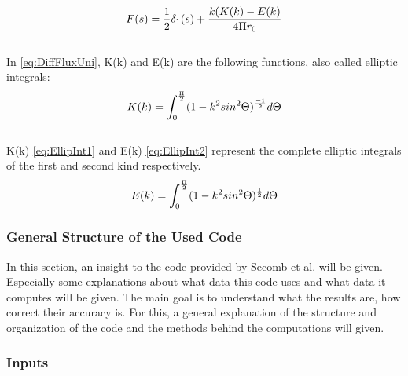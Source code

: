 %
\begin{equation}
\\F(s) = \frac{1}{2} \delta_1 (s) + \frac{k (K(k) - E(k)}{4 \Pi r_0}
\label{eq:DiffFluxUni}
\end{equation}
\\In \ref{eq:DiffFluxUni}, K(k) and E(k) are the following functions, also called elliptic integrals:
%
\begin{equation}
\\K(k) = \int_{0}^{\frac{\Pi}{2}} (1 - k^2 sin^2 \Theta)^ \frac{-1}{2} d \Theta
\label{eq:EllipInt1}
\end{equation}
\\K(k) \ref{eq:EllipInt1} and E(k) \ref{eq:EllipInt2} represent the complete elliptic integrals of the first and second kind respectively.
%
\begin{equation}
\\E(k) = \int_{0}^{\frac{\Pi}{2}} (1 - k^2 sin^2 \Theta)^ \frac{1}{2} d \Theta
\label{eq:EllipInt2}
\end{equation}

\subsubsection{General Structure of the Used Code}

In this section, an insight to the code provided by Secomb et al. \cite{Secomb2004} will be given. Especially some explanations about what data this code uses and what data it computes will be given. 
The main goal is to understand what the results are, how correct their accuracy is. For this, a general explanation of the structure and organization of the code and the methods behind the computations will given.

\subsubsection*{Inputs}
\label{Inputs}

